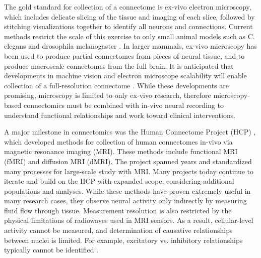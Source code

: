 \documentclass[11pt]{article}
\begin{document}
The gold standard for collection of a connectome is ex-vivo electron microscopy, which includes delicate slicing of the tissue and imaging of each slice, followed by stitching visualizations together to identify all neurons and connections. Current methods restrict the scale of this exercise to only small animal models such as C. elegans and drosophila melanogaster \cite{white1986structure, emmons2015connectomics, wikipedia2025connectome}. In larger mammals, ex-vivo microscopy has been used to produce partial connectomes from pieces of neural tissue, and to produce macroscale connectomes from the full brain. It is anticipated that developments in machine vision and electron microscope scalability will enable collection of a full-resolution connectome \cite{wikipedia2025connectome, amunts2013bigbrain}. While these developments are promising, microscopy is limited to only ex-vivo research, therefore microscopy-based connectomics must be combined with in-vivo neural recording to understand functional relationships and work toward clinical interventions.

A major milestone in connectomics was the Human Connectome Project (HCP) \cite{elam2021hcp}, which developed methods for collection of human connectomes in-vivo via magnetic resonance imaging (MRI). These methods include functional MRI (fMRI) and diffusion MRI (dMRI). The project spanned years and standardized many processes for large-scale study with MRI. Many projects today continue to iterate and build on the HCP with expanded scope, considering additional populations and analyses. While these methods have proven extremely useful in many research cases, they observe neural activity only indirectly by measuring fluid flow through tissue. Measurement resolution is also restricted by the physical limitations of radiowaves used in MRI sensors. As a result, cellular-level activity cannot be measured, and determination of causative relationships between nuclei is limited. For example, excitatory vs. inhibitory relationships typically cannot be identified \cite{wikipedia2025neuroimaging}.
\end{document}
